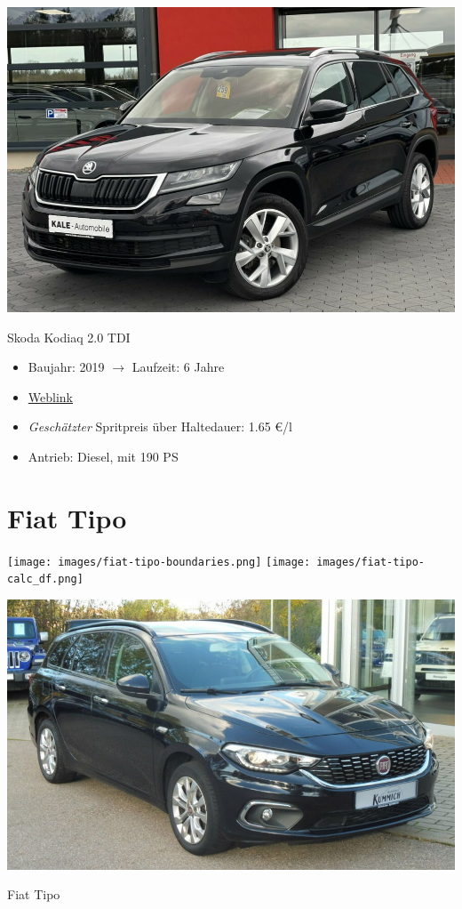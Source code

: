 \documentclass[landscape, DIV=99, 14pt]{scrartcl}
\begin{document}
\pagebreak
\null
\vspace{2cm}
\begin{center}
\includegraphics[width=0.9\columnwidth]{cars/skoda-kodiaq-2p0-tdi.png}

Skoda Kodiaq 2.0 TDI
\end{center}

\begin{itemize}
    \item Baujahr: 2019 $\rightarrow$ Laufzeit: 6 Jahre
    \item \href{https://suchen.mobile.de/fahrzeuge/details.html?id=319879014}{Weblink}
    \item \emph{Gesch\"atzter} Spritpreis \"uber Haltedauer: 1.65 \euro{}/l
    \item Antrieb: Diesel, mit 190 PS
\end{itemize}

\pagebreak


\twocolumn

\section*{Fiat Tipo}
\begin{center}
\texttt{[image: images/fiat-tipo-boundaries.png]}
\null
\vspace{0.5cm}
\texttt{[image: images/fiat-tipo-calc\_df.png]}
\end{center}

\pagebreak
\null
\vspace{2cm}
\begin{center}
\includegraphics[width=0.9\columnwidth]{cars/fiat-tipo.png}

Fiat Tipo
\end{center}
\end{document}

